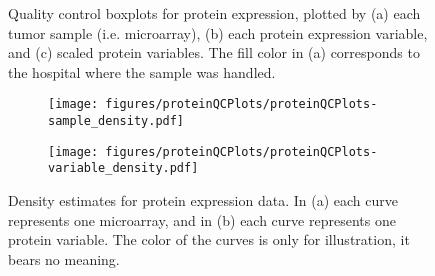 \begin{figure}
	\centering
	\begin{subfigure}{1\textwidth}
		\centering
	\end{subfigure}
	\begin{subfigure}{1\textwidth}
		\centering
	\end{subfigure}
	\begin{subfigure}{1\textwidth}
		\centering
	\end{subfigure}

	\caption{Quality control boxplots for protein expression, plotted by
	(a) each tumor sample (i.e. microarray),
	(b) each protein expression variable, 
	and (c) scaled protein variables.
	The fill color in (a) corresponds to the hospital where the sample was handled.}
	\label{fig:qc-protein-boxplot}
\end{figure}


\begin{figure}[!h]
	\centering
	\begin{subfigure}{.45\textwidth}
		\centering
		\texttt{[image: figures/proteinQCPlots/proteinQCPlots-sample\_density.pdf]}
	\end{subfigure}
	\begin{subfigure}{.45\textwidth}
		\centering
		\texttt{[image: figures/proteinQCPlots/proteinQCPlots-variable\_density.pdf]}
	\end{subfigure}

	\caption{Density estimates for protein expression data. In (a) each curve represents one microarray,
	and in (b) each curve represents one protein variable. The color of the curves is only for illustration,
	it bears no meaning.}
	\label{fig:qc-protein-density}
\end{figure}


